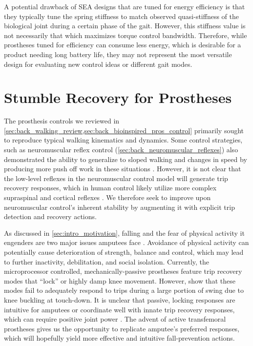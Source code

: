 A potential drawback of SEA designs that are tuned for energy efficiency is that
they typically tune the spring stiffness to match observed quasi-stiffness
of the biological joint during a certain phase of the gait. However, this
stiffness value is not necessarily that which maximizes torque control
bandwidth. Therefore, while prostheses tuned for efficiency can consume less
energy, which is desirable for a product needing long battery life, they may
not represent the most versatile design for evaluating new control ideas or
different gait modes. 

\section{Stumble Recovery for Prostheses}\label{sec:back_stumble_recovery}
The prosthesis controls we reviewed in
\cref{sec:back_walking_review,sec:back_bioinspired_pros_control} primarily
sought to reproduce typical walking kinematics and dynamics. Some control
strategies, such as neuromuscular reflex control
(\cref{sec:back_neuromuscular_reflexes}) also demonstrated the ability to
generalize to sloped walking and changes in speed by producing more push off
work in these situations \citep{eilenberg2010control, markowitz2011speed}.
However, it is not clear that the low-level reflexes in the neuromuscular
control model will generate trip recovery responses, which in human control
likely utilize more complex supraspinal and cortical reflexes
\citep{eng1994strategies, schillings2000muscular, hofstad2009evidence}.
We therefore seek to improve upon neuromuscular control's inherent stability
by augmenting it with explicit trip detection and recovery actions.

As discussed in \cref{sec:intro_motivation}, falling and the fear of physical
activity it engenders are two major issues amputees face
\citep{miller2001prevalence}. Avoidance of physical activity can potentially
cause deterioration of strength, balance and control, which may lead to further
inactivity, debilitation, and social isolation. Currently, the microprocessor
controlled, mechanically-passive prostheses feature trip recovery modes that
``lock'' or highly damp knee movement. However, \citet{bellmann2010comparative}
show that these modes fail to adequately respond to trips during a large portion
of swing due to knee buckling at touch-down.  It is unclear that passive,
locking responses are intuitive for amputees or coordinate well with innate trip
recovery responses, which can require positive joint power
\citep{cordero2005energy}. The advent of active transfemoral prostheses gives us
the opportunity to replicate amputee's preferred responses, which will hopefully
yield more effective and intuitive fall-prevention actions.

